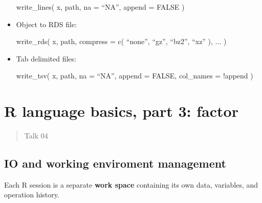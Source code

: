 \documentclass[
]{article}
\newenvironment{Shaded}{}{}
\newcommand{\AttributeTok}[1]{\textcolor[rgb]{0.49,0.56,0.16}{#1}}
\newcommand{\ConstantTok}[1]{\textcolor[rgb]{0.53,0.00,0.00}{#1}}
\newcommand{\FunctionTok}[1]{\textcolor[rgb]{0.02,0.16,0.49}{#1}}
\newcommand{\NormalTok}[1]{#1}
\newcommand{\SpecialCharTok}[1]{\textcolor[rgb]{0.25,0.44,0.63}{#1}}
\begin{document}
\begin{itemize}
\begin{Shaded}
\begin{Highlighting}[]
\FunctionTok{write\_lines}\NormalTok{(}
\NormalTok{  x,}
\NormalTok{  path,}
  \AttributeTok{na =}\NormalTok{ “NA”, }
  \AttributeTok{append =} \ConstantTok{FALSE}
\NormalTok{) }
\end{Highlighting}
\end{Shaded}
\item
  Object to RDS file:

\begin{Shaded}
\begin{Highlighting}[]
\FunctionTok{write\_rds}\NormalTok{(}
\NormalTok{  x,}
\NormalTok{  path, }
  \AttributeTok{compress =} 
  	\FunctionTok{c}\NormalTok{(}
\NormalTok{      “none”,}
\NormalTok{      “gz”,}
\NormalTok{      “bz2”,}
\NormalTok{      “xz”}
\NormalTok{    ),}
\NormalTok{  ...}
\NormalTok{)}
\end{Highlighting}
\end{Shaded}
\item
  Tab delimited files:

\begin{Shaded}
\begin{Highlighting}[]
\FunctionTok{write\_tsv}\NormalTok{(}
\NormalTok{  x, }
\NormalTok{  path, }
  \AttributeTok{na =}\NormalTok{ “NA”, }
  \AttributeTok{append =} \ConstantTok{FALSE}\NormalTok{, }
  \AttributeTok{col\_names =} \SpecialCharTok{!}\NormalTok{append}
\NormalTok{)}
\end{Highlighting}
\end{Shaded}
\end{itemize}

\hypertarget{r-language-basics-part-3-factor}{%
\section{R language basics, part 3:
factor}\label{r-language-basics-part-3-factor}}

\begin{quote}
Talk 04
\end{quote}

\hypertarget{io-and-working-enviroment-management}{%
\subsection{IO and working enviroment
management}\label{io-and-working-enviroment-management}}

Each R session is a separate \textbf{work space} containing its own
data, variables, and operation history.
\end{document}
